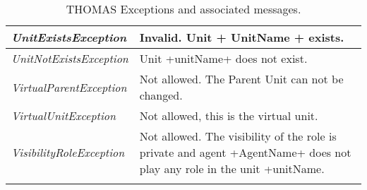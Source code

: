 \begin{longtable}{|p{6.5cm}|p{7.2cm}|}
  \emph{UnitExistsException} & Invalid. Unit + UnitName +  exists. \\ \hline
  \emph{UnitNotExistsException} & Unit +unitName+ does not exist. \\ \hline
  \emph{VirtualParentException} & Not allowed. The Parent Unit can not be changed. \\ \hline
  \emph{VirtualUnitException} & Not allowed, this is the virtual unit. \\ \hline
  \emph{VisibilityRoleException} & Not allowed. The visibility of the role is private and agent +AgentName+ does not play any role in the unit +unitName. \\ \hline

\caption{THOMAS Exceptions and associated messages.}
\end{longtable}
